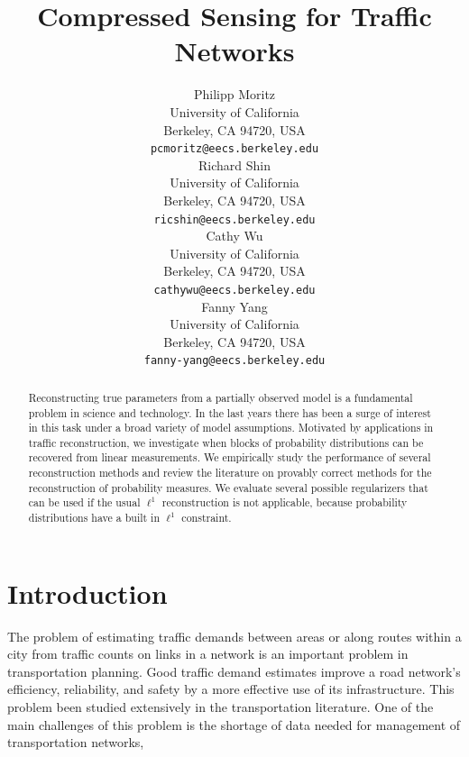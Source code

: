 \documentclass{article} %
\begin{document}
\title{Compressed Sensing for Traffic Networks}

\author{
Philipp Moritz\\
University of California\\
Berkeley, CA 94720, USA\\
\texttt{pcmoritz@eecs.berkeley.edu}\\
\And
Richard Shin\\
University of California\\
Berkeley, CA 94720, USA\\
\texttt{ricshin@eecs.berkeley.edu}\\
\And
Cathy Wu\\
University of California\\
Berkeley, CA 94720, USA\\
\texttt{cathywu@eecs.berkeley.edu}\\
\And
Fanny Yang\\
University of California\\
Berkeley, CA 94720, USA\\
\texttt{fanny-yang@eecs.berkeley.edu} \\
}

\maketitle

\begin{abstract}
Reconstructing true parameters from a partially observed model is a fundamental problem in science and technology.
In the last years there has been a surge of interest in this task under a broad variety of model assumptions.
Motivated by applications in traffic reconstruction, we investigate when blocks of probability distributions can be recovered from linear measurements.
We empirically study the performance of several reconstruction methods and review the literature on provably correct methods for the reconstruction of probability measures.
We evaluate several possible regularizers that can be used if the usual $\ell^1$ reconstruction is not applicable, because probability distributions have a built in $\ell^1$ constraint.
\end{abstract}

\section{Introduction}
The problem of estimating traffic demands between areas or along routes within a city from traffic counts on links in a network is an important problem in transportation planning. Good traffic demand estimates improve a road network's efficiency, reliability, and safety by a more effective use of its infrastructure. This problem been studied extensively in the transportation literature. One of the main challenges of this problem is the shortage of data needed for management of transportation networks, 
\end{document}
